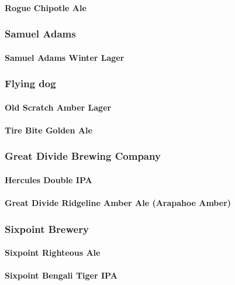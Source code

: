 \documentclass[11pt]{article}
\begin{document}
\paragraph{Rogue Chipotle Ale}
\label{sec:orge87fed4}
\subsubsection{Samuel Adams}
\label{sec:org5c22dfe}
\paragraph{Samuel Adams Winter Lager}
\label{sec:orga0b8304}
\subsubsection{Flying dog}
\label{sec:org5bc284f}
\paragraph{Old Scratch Amber Lager}
\label{sec:org7463222}
\paragraph{Tire Bite Golden Ale}
\label{sec:org2b585af}
\subsubsection{Great Divide Brewing Company}
\label{sec:orgb051c78}
\paragraph{Hercules Double IPA}
\label{sec:org90dca28}
\paragraph{Great Divide Ridgeline Amber Ale (Arapahoe Amber)}
\label{sec:orgcca55f2}
\subsubsection{Sixpoint Brewery}
\label{sec:org344f2d7}
\paragraph{Sixpoint Righteous Ale}
\label{sec:orgc229220}
\paragraph{Sixpoint Bengali Tiger IPA}
\label{sec:orga9e3a6e}
\end{document}
